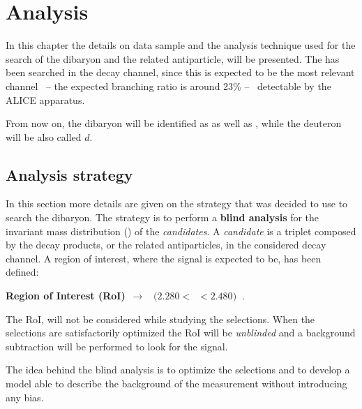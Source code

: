 %
\chapter{Analysis} \label{sec:4}


In this chapter the details on data sample and the analysis technique used for the search of the \dst
dibaryon and the related antiparticle, will be presented. 
The \dst has been searched in the \dstdecay decay channel, since this is expected to be the
most relevant channel \ -- the expected branching ratio is around 23\% -- \ detectable by the
ALICE apparatus.

From now on, the \dst dibaryon will be identified as \ds as well as \dst, while the deuteron
will be also called $d$.

%
%
\section{Analysis strategy} \label{sec:4.1}

In this section more details are given on the strategy that was decided to use to search the
\dst dibaryon. 
The strategy is to perform a \textbf{blind analysis} for the invariant mass distribution
(\minv) of the \dst \textit{candidates}. A \ds \textit{candidate} is a triplet composed 
by the \ds decay products, or the related antiparticles, in the considered decay channel.
A region of interest, where the \ds signal is expected to be, has been defined:
\begin{center}
\textbf{Region of Interest (RoI)}\  $\rightarrow$ \  $(2.280  < $\ \minv$  < 2.480)\ $ \gevcs.
\end{center}
The RoI, will not be considered while studying the selections.
When the selections are satisfactorily optimized the RoI will be \textit{unblinded} and a
background subtraction will be performed to look for the signal.

The idea behind the blind analysis is to optimize the selections and to develop a model
able to describe the background of the measurement without introducing any bias. 

